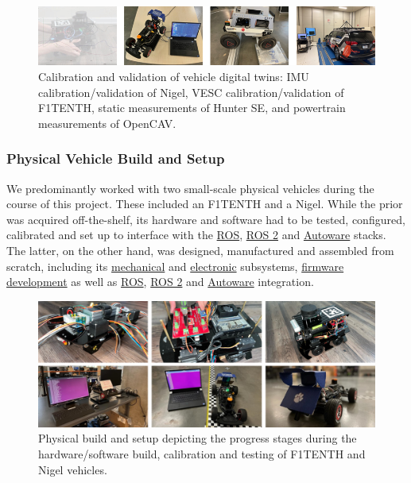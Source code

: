 \begin{figure}[t]
    \centering
    \includegraphics[width=\linewidth]{Figures/fig6.png}
    \caption{Calibration and validation of vehicle digital twins: IMU calibration/validation of Nigel, VESC calibration/validation of F1TENTH, static measurements of Hunter SE, and powertrain measurements of OpenCAV.}
    \label{fig: figure6}
\end{figure}

\subsubsection{Physical Vehicle Build and Setup}
\label{Sub-Section: Physical Vehicle Build and Setup}

We predominantly worked with two small-scale physical vehicles during the course of this project. These included an F1TENTH and a Nigel. While the prior was acquired off-the-shelf, its hardware and software had to be tested, configured, calibrated and set up to interface with the \href{https://github.com/Tinker-Twins/AutoDRIVE-F1TENTH}{ROS}, \href{https://github.com/Tinker-Twins/AutoDRIVE-F1TENTH}{ROS 2} and \href{https://github.com/Tinker-Twins/AutoDRIVE-Autoware}{Autoware} stacks. The latter, on the other hand, was designed, manufactured and assembled from scratch, including its \href{https://github.com/AutoDRIVE-Ecosystem/Nigel-SolidWorks}{mechanical} and \href{https://github.com/AutoDRIVE-Ecosystem/Nigel-Fritzing}{electronic} subsystems, \href{https://github.com/AutoDRIVE-Ecosystem/Nigel-Arduino}{firmware development} as well as \href{https://github.com/Tinker-Twins/AutoDRIVE/tree/AutoDRIVE-Devkit/ADSS Toolkit/autodrive_ros/autodrive_nigel}{ROS}, \href{https://github.com/Tinker-Twins/AutoDRIVE/tree/AutoDRIVE-Devkit/ADSS Toolkit/autodrive_ros2/autodrive_nigel}{ROS 2} and \href{https://github.com/Tinker-Twins/AutoDRIVE-Autoware}{Autoware} integration.

\begin{figure}[h]
    \centering
    \includegraphics[width=\linewidth]{Figures/fig7.png}
    \caption{Physical build and setup depicting the progress stages during the hardware/software build, calibration and testing of F1TENTH and Nigel vehicles.}
    \label{fig: figure7}
\end{figure}

